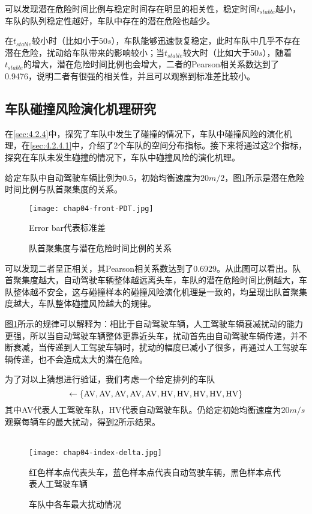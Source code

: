 可以发现潜在危险时间比例与稳定时间存在明显的相关性，稳定时间$t_{stable}$越小，车队的队列稳定性越好，车队中存在的潜在危险也越少。

在$t_{stable}$较小时（比如小于$50s$），车队能够迅速恢复稳定，此时车队中几乎不存在潜在危险，扰动给车队带来的影响较小；当$t_{stable}$较大时（比如大于$50s$），随着$t_{stable}$的增大，潜在危险时间比例也会增大，二者的Pearson相关系数达到了0.9476，说明二者有很强的相关性，并且可以观察到标准差比较小。

\subsection{车队碰撞风险演化机理研究}

在\ref{sec:4.2.4}中，探究了车队中发生了碰撞的情况下，车队中碰撞风险的演化机理，在\ref{sec:4.2.4.1}中，介绍了2个车队的空间分布指标。接下来将通过这2个指标，探究在车队未发生碰撞的情况下，车队中碰撞风险的演化机理。

给定车队中自动驾驶车辆比例为$0.5$，初始均衡速度为$20m/2$，图\ref{fig:chap04-9}所示是潜在危险时间比例与队首聚集度的关系。

\begin{figure}
    \centering
    \texttt{[image: chap04-front-PDT.jpg]}
    \caption*{Error bar代表标准差}
    \caption{队首聚集度与潜在危险时间比例的关系}
    \label{fig:chap04-9}
\end{figure} 

可以发现二者呈正相关，其Pearson相关系数达到了0.6929。从此图可以看出。队首聚集度越大，自动驾驶车辆整体越远离头车，车队的潜在危险时间比例越大，车队整体越不安全，这与碰撞样本的碰撞风险演化机理是一致的，均呈现出队首聚集度越大，车队整体碰撞风险越大的规律。

图\ref{fig:chap04-9}所示的规律可以解释为：相比于自动驾驶车辆，人工驾驶车辆衰减扰动的能力更强，所以当自动驾驶车辆整体更靠近头车，扰动首先由自动驾驶车辆传递，并不断衰减，当传递到人工驾驶车辆时，扰动的幅度已减小了很多，再通过人工驾驶车辆传递，也不会造成太大的潜在危险。

为了对以上猜想进行验证，我们考虑一个给定排列的车队
\begin{equation}
    \leftarrow \{\mathrm{AV, AV, AV, AV, AV, HV, HV, HV, HV, HV}\} \notag
\end{equation}
其中AV代表人工驾驶车队，HV代表自动驾驶车队。仍给定初始均衡速度为$20m/s$观察每辆车的最大扰动，得到\ref{fig:chap04-10}所示结果。 \\\\

\begin{figure}
    \centering
    \texttt{[image: chap04-index-delta.jpg]}
    \caption*{红色样本点代表头车，蓝色样本点代表自动驾驶车辆，黑色样本点代表人工驾驶车辆}
    \caption{车队中各车最大扰动情况}
    \label{fig:chap04-10}
\end{figure} 

